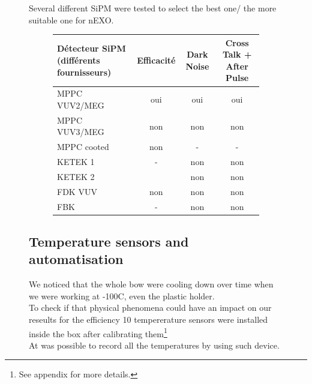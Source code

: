 \documentclass[a4paper, 11pt]{report}%
\begin{document}
\begin{figure}[!hbtp]
  Several different SiPM were tested to select the best one/ the more suitable one for nEXO.
  
  \begin{figure}[!hbtp]
  \centering
  \begin{tabular}{|l|c|c|c|}
  \hline
  D\'etecteur SiPM (diff\'erents fournisseurs) &Efficacit\'e &Dark Noise &Cross Talk + After Pulse\\
  \hline
  MPPC VUV2/MEG &oui &oui &oui\\
  \hline
  MPPC VUV3/MEG &non &non &non\\
  \hline
  MPPC cooted &non &- &-\\
  \hline
  KETEK 1 &- &non &non\\
  \hline
  KETEK 2 & &non &non\\
  \hline
  FDK VUV &non &non &non\\
  \hline
  FBK &- &non &non\\
  \hline
  \end{tabular}
  \end{figure}
  
  \subsection{Temperature sensors and automatisation}
  
  We noticed that the whole bow were cooling down over time when we were working at -100C, even the plastic holder.\\
  To check if that physical phenomena could have an impact on our reseults for the efficiency 10 tempererature sensors were installed inside 
  the box after calibrating them\footnote{See appendix for more details.}\\
  At was possible to record all the temperatures by using such device. 
  

\end{figure}
\end{document}
